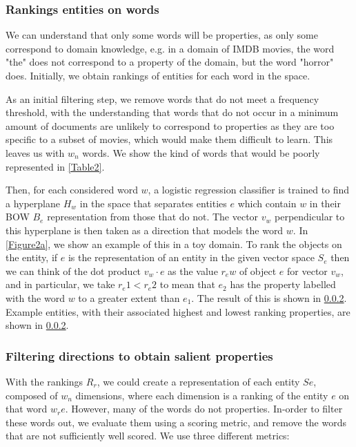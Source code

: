 \subsubsection{Rankings entities on words}
We can understand that only some words will be properties, as only some correspond to domain knowledge, e.g. in a domain of IMDB movies, the word "the" does not correspond to a property of the domain, but the word "horror" does. Initially, we obtain rankings of entities for each word in the space. 

As an initial filtering step, we remove words that do not meet a frequency threshold, with the understanding that words that do not occur in a minimum amount of documents are unlikely to correspond to properties as they are too specific to a subset of movies, which would make them difficult to learn. This leaves us with $w_n$ words. We show the kind of words that would be poorly represented  in \ref{Table2}.%

Then, for each considered word $w$, a logistic regression classifier is trained to find a hyperplane $H_w$ in the space that separates entities $e$ which contain $w$ in their BOW $B_e$ representation from those that do not. %
The vector $v_w$ perpendicular to this hyperplane is then taken as a direction that models the word $w$. In \ref{Figure2a}, we show an example of this in a toy domain. %
To rank the objects on the entity, if $e$ is the representation of an entity in the given vector space $S_e$ then we can think of the dot product $v_w \cdot e$ as the value $r_ew$ of object $e$ for vector $v_w$, and in particular, we take $r_e1 < r_e2$ to mean that $e_2$ has the property labelled with the word $w$ to a greater extent than $e_1$. The result of this is shown in \ref{}. Example entities, with their associated highest and lowest ranking properties, are shown in \ref{}. %

\subsubsection{Filtering directions to obtain salient properties}
With the rankings $R_r$, we could create a representation of each entity $Se$,   composed of $w_n$ dimensions, where each dimension is a ranking of the entity $e$ on that word $w_re$. However, many of the words do not  properties. In-order to filter these words out, we evaluate them using a scoring metric, and remove the words that are not sufficiently well scored. We use three different metrics:

